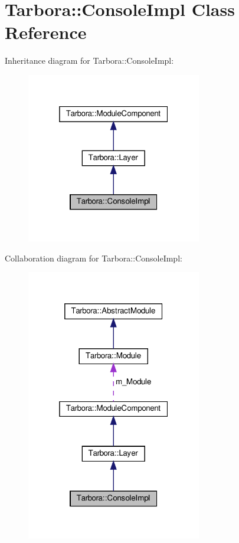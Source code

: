 \hypertarget{classTarbora_1_1ConsoleImpl}{}\section{Tarbora\+:\+:Console\+Impl Class Reference}
\label{classTarbora_1_1ConsoleImpl}


Inheritance diagram for Tarbora\+:\+:Console\+Impl\+:
\nopagebreak
\begin{figure}[H]
\begin{center}
\leavevmode
\includegraphics[width=217pt]{classTarbora_1_1ConsoleImpl__inherit__graph}
\end{center}
\end{figure}


Collaboration diagram for Tarbora\+:\+:Console\+Impl\+:
\nopagebreak
\begin{figure}[H]
\begin{center}
\leavevmode
\includegraphics[width=217pt]{classTarbora_1_1ConsoleImpl__coll__graph}
\end{center}
\end{figure}
